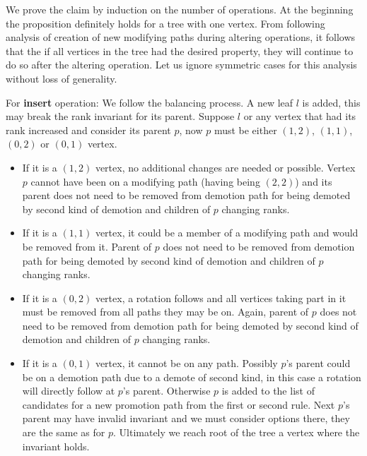 \begin{myproof}
We prove the claim by induction on the number of operations. At the beginning the proposition definitely holds for a tree with one vertex. 
From following analysis of creation of new modifying paths during altering operations, it follows that the if all vertices in the tree had the desired property, they will continue to do so after the altering operation.
Let us ignore symmetric cases for this analysis without loss of generality.

For \textbf{insert} operation: We follow the balancing process. A new leaf $l$ is added, this may break the rank invariant for its parent. Suppose $l$ or any vertex that had its rank increased and consider its parent $p$, now $p$ must be either $(1,2)$, $(1,1)$, $(0,2)$ or $(0,1)$ vertex. 

\begin{itemize}

\item If it is a $(1,2)$ vertex, no additional changes are needed or possible. 
Vertex $p$ cannot have been on a modifying path (having being $(2,2)$) and its parent does not need to be removed from demotion path for being demoted by second kind of demotion and children of $p$ changing ranks.

\item If it is a $(1,1)$ vertex, it could be a member of a modifying path and would be removed from it. 
Parent of $p$ does not need to be removed from demotion path for being demoted by second kind of demotion and children of $p$ changing ranks.

\item If it is a $(0,2)$ vertex, a rotation follows and all vertices taking part in it must be removed from all paths they may be on. Again, parent of $p$ does not need to be removed from demotion path for being demoted by second kind of demotion and children of $p$ changing ranks.

\item If it is a $(0,1)$ vertex, it cannot be on any path. Possibly $p$'s parent could be on a demotion path due to a demote of second kind, in this case a rotation will directly follow at $p$'s parent. Otherwise $p$ is added to the list of candidates for a new promotion path from the first or second rule. Next $p$'s parent may have invalid invariant and we must consider options there, they are the same as for $p$. Ultimately we reach root of the tree a vertex where the invariant holds.


\end{itemize}
\end{myproof}
